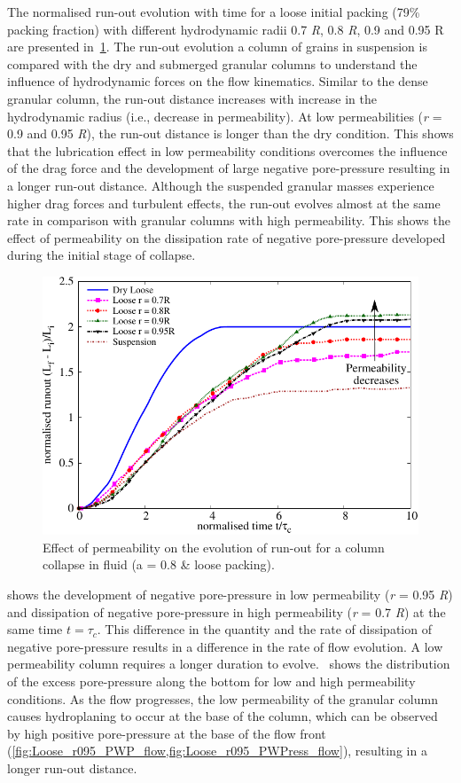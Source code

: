 \documentclass[12pt,a4paper,twocolumn,fleqn]{narms}
\begin{document}
The normalised run-out evolution with time for a loose initial packing (79\% 
packing fraction) with different hydrodynamic radii 0.7 \textit{R}, 0.8 
\textit{R}, 0.9 and 0.95 R are presented in~\cref{fig:Runout_a08_loose}. The 
run-out evolution a column of grains in suspension is compared with the dry and 
submerged granular columns to understand the influence of hydrodynamic forces 
on the flow kinematics. Similar to the dense granular column, the run-out 
distance increases with increase in the hydrodynamic radius (i.e., decrease in 
permeability). At low permeabilities (\textit{r} = 0.9 and 0.95 \textit{R}), 
the run-out distance is longer than the dry condition. This shows that the 
lubrication effect in low permeability conditions overcomes the influence of 
the drag force and the development of large negative pore-pressure resulting in 
a longer run-out distance. Although the suspended granular masses experience 
higher drag forces and turbulent effects, the run-out evolves almost at the 
same rate in comparison with granular columns with high permeability. This 
shows the effect of permeability on the dissipation rate of negative 
pore-pressure developed during the initial stage of collapse.

\begin{figure}
\centering
\includegraphics[width=0.9\linewidth]{figs/Runout_a08_loose.pdf}
\caption{Effect of permeability on the evolution of run-out for a column 
collapse in fluid (a = 0.8 \& loose packing).}
\label{fig:Runout_a08_loose}
\end{figure}

 shows the development of negative pore-pressure in low 
permeability (\textit{r} = 0.95 \textit{R}) and dissipation of negative 
pore-pressure in high permeability (\textit{r} = 0.7 \textit{R}) at the same 
time $ t = \tau_c$. This difference in the quantity and the rate of dissipation 
of negative pore-pressure results in a difference in the rate of flow 
evolution. A low permeability column requires a longer duration to 
evolve.~ shows the distribution of the excess 
pore-pressure along the bottom for low and high permeability conditions. As the 
flow progresses, the low permeability of the granular column causes 
hydroplaning to occur at the base of the column, which can be observed by high 
positive pore-pressure at the base of the flow front 
(\cref{fig:Loose_r095_PWP_flow,fig:Loose_r095_PWPress_flow}), resulting in a 
longer run-out distance.
\end{document}
